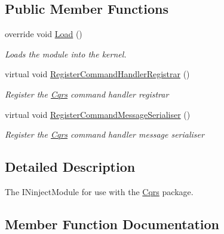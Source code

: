 \subsection*{Public Member Functions}
\begin{DoxyCompactItemize}
\item 
override void \hyperlink{classCqrs_1_1Azure_1_1EventHub_1_1CommandBus_1_1Configuration_1_1AzureCommandBusReceiverModule_a3cad31c47c77dd2f964bf8e47b10f61f}{Load} ()
\begin{DoxyCompactList}\small\item\em Loads the module into the kernel. \end{DoxyCompactList}\item 
virtual void \hyperlink{classCqrs_1_1Azure_1_1EventHub_1_1CommandBus_1_1Configuration_1_1AzureCommandBusReceiverModule_a62975fe00dd6c7f62b5eba6bb6eed7c4}{Register\+Command\+Handler\+Registrar} ()
\begin{DoxyCompactList}\small\item\em Register the \hyperlink{namespaceCqrs}{Cqrs} command handler registrar \end{DoxyCompactList}\item 
virtual void \hyperlink{classCqrs_1_1Azure_1_1EventHub_1_1CommandBus_1_1Configuration_1_1AzureCommandBusReceiverModule_a03805080424e87926083c35d45ffc550}{Register\+Command\+Message\+Serialiser} ()
\begin{DoxyCompactList}\small\item\em Register the \hyperlink{namespaceCqrs}{Cqrs} command handler message serialiser \end{DoxyCompactList}\end{DoxyCompactItemize}


\subsection{Detailed Description}
The I\+Ninject\+Module for use with the \hyperlink{namespaceCqrs}{Cqrs} package. 



\subsection{Member Function Documentation}
\mbox{\label{classCqrs_1_1Azure_1_1EventHub_1_1CommandBus_1_1Configuration_1_1AzureCommandBusReceiverModule_a3cad31c47c77dd2f964bf8e47b10f61f}} 
